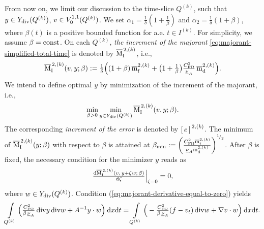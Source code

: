 %
From now on, we limit our discussion to the time-slice $Q^{(k)}$, such that \linebreak
$y \in Y_{\mathrm{div}} (Q^{(k)})$, $v \in {V}^{1, 1}_{0}(Q^{(k)})$. We set
$\alpha_1 = \tfrac{1}{\delta} (1 + \tfrac{1}{\beta})$ and 
$\alpha_2 = \tfrac{1}{\delta} (1 + \beta)$, 
where $\beta(t)$ is a positive bounded function for a.e. $t \in {I}^{(k)}$. 
For simplicity, we assume $\beta = {\rm const}$. On each $Q^{(k)}$, 
{\em the increment of the majorant} \eqref{eq:majorant-simplified-total-time} 
is denoted by $\overline{\mathrm M}^{\,2, (k)}_{\mathrm{I}}{}$, i.e., 
%
\begin{equation}
	\incrmajone (v, y; \beta) 
	:= \tfrac{1}{\delta}\Big((1 + \beta) \, \incrmfI + 
	\big ( 1 + \tfrac{1}{\beta} \big ) \tfrac{\CFriedrichs^2}{\underline{\nu}_A}  \,
	\incrmdI{k} \Big).
	\label{eq:majorant-simplified}
\end{equation}
%
We intend to define optimal $y$ by minimization of the increment of the majorant, i.e.,
%
\begin{equation*}
\Minimum_{\beta > 0}\Minimum_{y \in Y_{\dvrg} (Q^{(k)})} \incrmajone (v, y; \beta).
\end{equation*}
%
The corresponding {\em increment of the error} is denoted by ${[\,e\,]\,}^{2, (k)}$.
The minimum of $\overline{\mathrm M}^{\,2, (k)}_{\mathrm{I}} (y; \beta) $ 
with respect to $\beta$ is attained at 
% 
$\beta_{\min} := 
\left( \tfrac{C_{{\rm F}\Omega}^2 \overline{\mathrm m}^{2, (k)}_{\mathrm{f}} }{ \underline{\nu}_A \overline{\mathrm m}^{2, ({k})}_{\mathrm{d}}} \right)^{{}^{1}\!/_{2}}$.
%
After $\beta$ is fixed, the necessary condition for the minimizer $y$ reads as 
%
\begin{equation}
\tfrac{{\rm d}\incrmajone (v, \, y + \zeta w; \, \beta)}{{\rm d} \zeta} \Big|_{\zeta = 0} 
= 0, 
\label{eq:majorant-derivative-equal-to-zero}
\end{equation}
%
where $w \in Y_{\mathrm{div}} (Q^{(k)})$.
%
Condition (\ref{eq:majorant-derivative-equal-to-zero}) yields
%
\begin{equation*}
	\Int_{Q^{(k)}} \Big(\tfrac{\CFriedrichs^2}{\beta \, \underline{\nu}_A} \,
	                \dvrg y \, \dvrg w +  A^{-1} y \cdot w \Big) \dxt 
	= \Int_{Q^{(k)}} \Big( - \tfrac{\CFriedrichs^2}{\beta \, \underline{\nu}_A} ( f - v_t) \, \dvrg w
	                  + \nabla v \cdot w \Big) \dxt.
\end{equation*}
